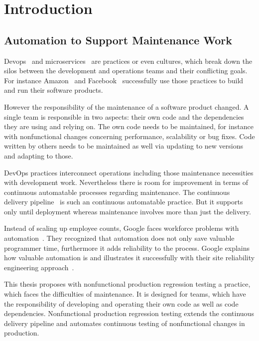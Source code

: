 \chapter{Introduction}
\section{Automation to Support Maintenance Work}

Devops~\cite{devops_definition} and microservices~\cite{microservices_fowler} are
practices or even cultures, which break down the silos between the development and
operations teams and their conflicting goals. For instance Amazon~\cite{build_run} and
Facebook~\cite{dev_at_fb} successfully use those practices to build and run their software
products.

However the responsibility of the maintenance of a software product changed. A single team
is responsible in two aspects: their own code and the dependencies they are using and
relying on. The own code needs to be maintained, for instance with nonfunctional changes
concerning performance, scalability or bug fixes. Code written by others needs to be
maintained as well via updating to new versions and adapting to those.

DevOps practices interconnect operations including those maintenance necessities with
development work. Nevertheless there is room for improvement in terms of continuous
automatable processes regarding maintenance. The continuous delivery
pipeline~\cite{cd_humble_pipeline} is such an continuous automatable practice. But it
supports only until deployment whereas maintenance involves more than just the delivery.

Instead of scaling up employee counts, Google faces workforce problems with
automation~\cite{sre_automation}. They recognized that automation does not only save
valuable programmer time, furthermore it adds reliability to the process. Google explains
how valuable automation is and illustrates it successfully with their site reliability
engineering approach~\cite{sre_intro}.

This thesis proposes with nonfunctional production regression testing a practice, which
faces the difficulties of maintenance. It is designed for teams, which have the
responsibility of developing and operating their own code as well as code
dependencies. Nonfunctional production regression testing extends the continuous delivery
pipeline and automates continuous testing of nonfunctional changes in production.

